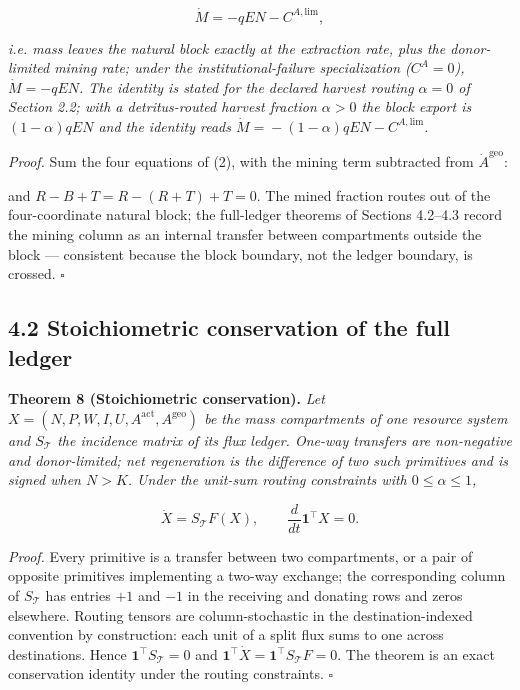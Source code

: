\documentclass[11pt]{article}
\begin{document}
$$\dot M = -qEN - C^{A,\mathrm{lim}},$$

 \emph{i.e. mass leaves the natural block exactly at the extraction rate, plus the donor-limited mining rate; under the institutional-failure specialization (\(C^A = 0\)), \(\dot M = -qEN\). The identity is stated for the declared harvest routing \(\alpha = 0\) of Section 2.2; with a detritus-routed harvest fraction \(\alpha > 0\) the block export is \((1-\alpha)qEN\) and the identity reads \(\dot M =\allowbreak{} -(1-\alpha)qEN - C^{A,\allowbreak{}\mathrm{lim}}\).}

\emph{Proof.} Sum the four equations of (2), with the mining term subtracted from \(\dot A^{\mathrm{geo}}\): 

\par\noindent{}\par

 and \(R - B +\allowbreak{} T =\allowbreak{} R - (R +\allowbreak{} T) +\allowbreak{} T =\allowbreak{} 0\). The mined fraction routes out of the four-coordinate natural block; the full-ledger theorems of Sections 4.2--4.3 record the mining column as an internal transfer between compartments outside the block --- consistent because the block boundary, not the ledger boundary, is crossed. \(\square\)

\subsection*{4.2 Stoichiometric conservation of the full ledger}\label{42-stoichiometric-conservation-of-the-full-ledger}

\textbf{Theorem 8 (Stoichiometric conservation).} \emph{Let \(X =\allowbreak{} (N,\allowbreak{} P,\allowbreak{} W,\allowbreak{} I,\allowbreak{} U,\allowbreak{} A^{\mathrm{act}},\allowbreak{} A^{\mathrm{geo}})\) be the mass compartments of one resource system and \(S_{\mathcal{T}}\) the incidence matrix of its flux ledger. One-way transfers are non-negative and donor-limited; net regeneration is the difference of two such primitives and is signed when \(N > K\). Under the unit-sum routing constraints with \(0 \le \alpha \le 1\),} 

$$\dot X = S_{\mathcal{T}} F(X), \qquad \frac{d}{dt}\mathbf{1}^\top X = 0.$$



\emph{Proof.} Every primitive is a transfer between two compartments, or a pair of opposite primitives implementing a two-way exchange; the corresponding column of \(S_{\mathcal{T}}\) has entries \(+1\) and \(-1\) in the receiving and donating rows and zeros elsewhere. Routing tensors are column-stochastic in the destination-indexed convention by construction: each unit of a split flux sums to one across destinations. Hence \(\mathbf{1}^\top S_{\mathcal{T}} =\allowbreak{} 0\) and \(\mathbf{1}^\top \dot X =\allowbreak{} \mathbf{1}^\top S_{\mathcal{T}} F =\allowbreak{} 0\). The theorem is an exact conservation identity under the routing constraints. \(\square\)
\end{document}
